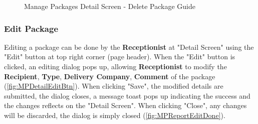 \begin{figure}[H]
	\centering
    \vspace{5pt}
  
    \vspace{10pt}
  
    \vspace{10pt}
    \caption{Manage Packages Detail Screen - Delete Package Guide}
	\label{fig:MPDetailDeleteGuide}
\end{figure}

\subsubsection{Edit Package}
\label{subsubsec:MPedit}

Editing a package can be done by the \textbf{Receptionist} at "Detail Screen" using the "Edit" button at top right corner (page header).
When the "Edit" button is clicked, an editing dialog pops up, allowing \textbf{Receptionist} to modify the \textbf{Recipient}, \textbf{Type}, \textbf{Delivery Company}, \textbf{Comment} of the package (\autoref{fig:MPDetailEditBtn}). 
When clicking "Save", the modified details are submitted, the dialog closes, a message toast pops up indicating the success and the changes reflects on the "Detail Screen". When clicking "Close", any changes will be discarded, the dialog is simply closed (\autoref{fig:MPReportEditDone}).

